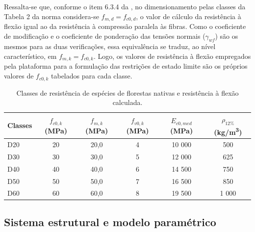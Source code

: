 Ressalta-se que, conforme o item 6.3.4 da \textcite{NBR7190-1:2022}, no dimensionamento pelas classes da Tabela 2 da norma considera-se $f_{m,d} = f_{c0,d}$, o valor de cálculo da resistência à flexão igual ao da resistência à compressão paralela às fibras.
Como o coeficiente de modificação e o coeficiente de ponderação das tensões normais ($\gamma_{wf}$) são os mesmos para as duas verificações, essa equivalência se traduz, ao nível característico, em $f_{m,k} = f_{c0,k}$.
Logo, os valores de resistência à flexão empregados pela plataforma para a formulação das restrições de estado limite são os próprios valores de $f_{c0,k}$ tabelados para cada classe.

\begin{table}[!ht]
\caption{Classes de resistência de espécies de florestas nativas e resistência à flexão calculada.\label{tab:classes_madeira}}
\begin{threeparttable}
\footnotesize
\setlength{\tabcolsep}{3pt}
\begin{tabular*}{\columnwidth}{@{\extracolsep{\fill}}lccccc@{\extracolsep{\fill}}}
\toprule
Classes & $f_{c0,k}$ (MPa) & $f_{m,k}$ (MPa) & $f_{v0,k}$ (MPa) & $E_{c0,med}$ (MPa) & $\rho_{12\%}$ (kg/m\textsuperscript{3}) \\
\midrule
D20 & 20 & 20,0 & 4 & 10 000 & 500 \\
D30 & 30 & 30,0 & 5 & 12 000 & 625 \\
D40 & 40 & 40,0 & 6 & 14 500 & 750 \\
D50 & 50 & 50,0 & 7 & 16 500 & 850 \\
D60 & 60 & 60,0 & 8 & 19 500 & 1 000 \\
\bottomrule
\end{tabular*}
\footnotesize
\end{threeparttable}
\end{table}
\subsection{Sistema estrutural e modelo paramétrico}\label{sec:sistema}

